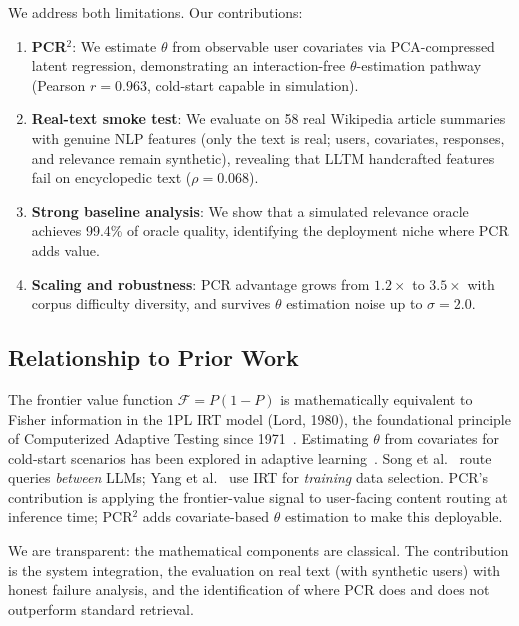 \documentclass{article}
\begin{document}
We address both limitations. Our contributions:

\begin{enumerate}
    \item \textbf{PCR$^2$}: We estimate $\theta$ from observable user covariates via PCA-compressed latent regression, demonstrating an interaction-free $\theta$-estimation pathway (Pearson $r=0.963$, cold-start capable in simulation).
    \item \textbf{Real-text smoke test}: We evaluate on 58 real Wikipedia article summaries with genuine NLP features (only the text is real; users, covariates, responses, and relevance remain synthetic), revealing that LLTM handcrafted features fail on encyclopedic text ($\rho=0.068$).
    \item \textbf{Strong baseline analysis}: We show that a simulated relevance oracle achieves 99.4\% of oracle quality, identifying the deployment niche where PCR adds value.
    \item \textbf{Scaling and robustness}: PCR advantage grows from $1.2\times$ to $3.5\times$ with corpus difficulty diversity, and survives $\theta$ estimation noise up to $\sigma=2.0$.
\end{enumerate}

\subsection{Relationship to Prior Work}

The frontier value function $\mathcal{F}=P(1{-}P)$ is mathematically equivalent to Fisher information in the 1PL IRT model (Lord, 1980), the foundational principle of Computerized Adaptive Testing since 1971~\cite{lord1971tailored, lord1980}. Estimating $\theta$ from covariates for cold-start scenarios has been explored in adaptive learning~\cite{park2019coldstart, pliakos2019coldstart, vandervelde2021coldstart}. Song et al.~\cite{song2025irt} route queries \emph{between} LLMs; Yang et al.~\cite{yang2026zpd} use IRT for \emph{training} data selection. PCR's contribution is applying the frontier-value signal to user-facing content routing at inference time; PCR$^2$ adds covariate-based $\theta$ estimation to make this deployable.

We are transparent: the mathematical components are classical. The contribution is the system integration, the evaluation on real text (with synthetic users) with honest failure analysis, and the identification of where PCR does and does not outperform standard retrieval.
\end{document}
